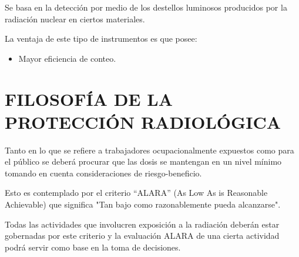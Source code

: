 Se basa en la detección por medio de los destellos luminosos producidos por la radiación nuclear en ciertos materiales.

La ventaja de este tipo de instrumentos es que posee:
\begin{itemize}
    \item Mayor eficiencia de conteo.
\end{itemize}

\chapter{FILOSOFÍA DE LA PROTECCIÓN RADIOLÓGICA}

Tanto en lo que se refiere a trabajadores ocupacionalmente expuestos como para el público se deberá procurar que las dosis se mantengan en un nivel mínimo tomando en cuenta consideraciones de riesgo-beneficio.

Esto es contemplado por el criterio ``ALARA'' (As Low As is Reasonable Achievable) que significa "Tan bajo como razonablemente pueda alcanzarse".

Todas las actividades que involucren exposición a la radiación deberán estar gobernadas por este criterio y la evaluación ALARA de una cierta actividad podrá servir como base en la toma de decisiones.
